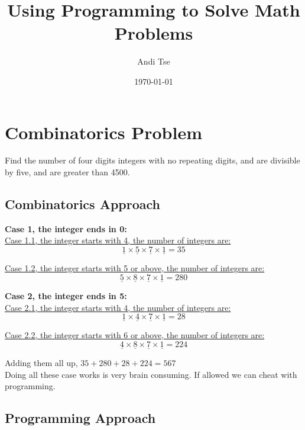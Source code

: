 \documentclass{article}
\title{Using Programming to Solve Math Problems}
\author{Andi Tse}
\date{\today}
\begin{document}
\maketitle
\tableofcontents
\newpage


\section{Combinatorics Problem}
\begin{custom-big}[Question 1]
Find the number of four digits integers with no repeating digits, and are divisible by five, and are greater than 4500. 

\end{custom-big}
\subsection*{Combinatorics Approach}
    \textbf{Case 1, the integer ends in 0:}\\
    \underline{Case 1.1, the integer starts with 4, the number of integers are:}\\
    \[\underline{1}\times \underline{5}\times \underline{7}\times \underline{1}=35\tag{The second digit has to be chosen from $5,6,7,8,9$}\]
    
    \underline{Case 1.2, the integer starts with 5 or above, the number of integers are:}\\
    \[\underline{5}\times \underline{8}\times \underline{7}\times \underline{1}=280\]
    
    
    \textbf{Case 2, the integer ends in 5:}\\
    \underline{Case 2.1, the integer starts with 4, the number of integers are:}\\
    \[\underline{1}\times \underline{4}\times \underline{7}\times \underline{1}=28\tag{The second digit has to be chosen from $6,7,8,9$}\]
    
    \underline{Case 2.2, the integer starts with 6 or above, the number of integers are:}\\
    \[\underline{4}\times \underline{8}\times \underline{7}\times \underline{1}=224\]

    Adding them all up, $35+280+28+224=567$\\
    Doing all these case works is very brain consuming. If allowed we can cheat with programming. 
    \pagebreak
\subsection*{Programming Approach}
\end{document}
